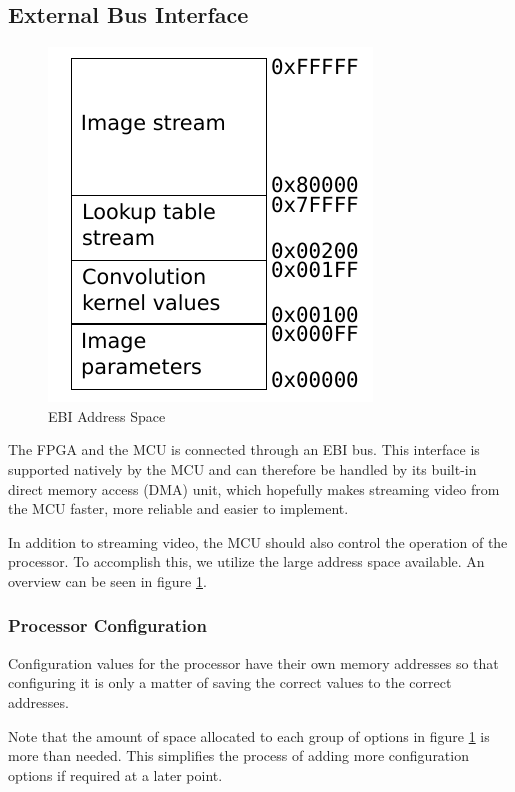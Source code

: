 \clearpage %
\subsection{External Bus Interface}
\begin{figure}
    \centering
    \includegraphics[]{img/EbiAddressSpace.pdf}
    \caption{EBI Address Space}
    \label{fig:EbiAddressSpace}
\end{figure}
The FPGA and the MCU is connected through an EBI bus.
This interface is supported natively by the MCU and can therefore be handled by its built-in direct memory access (DMA) unit, which hopefully makes streaming video from the MCU faster, more reliable and easier to implement.

In addition to streaming video, the MCU should also control the operation of the processor.
To accomplish this, we utilize the large address space available.
An overview can be seen in figure \ref{fig:EbiAddressSpace}.

\subsubsection{Processor Configuration}
Configuration values for the processor have their own memory addresses so that configuring it is only a matter of saving the correct values to the correct addresses.

Note that the amount of space allocated to each group of options in figure \ref{fig:EbiAddressSpace} is more than needed.
This simplifies the process of adding more configuration options if required at a later point.

